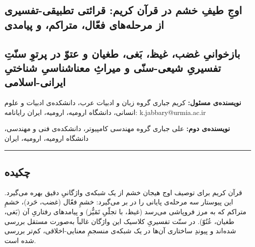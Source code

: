 \begin{RTL}
\begin{otherlanguage}{persian}

\section{اوجِ طیفِ خشم در قرآن کریم: قرائتی تطبیقی-تفسیری از مرحله‌های
فعّال، متراکم، و
پیامدی}\label{ux627ux648ux62c-ux637ux6ccux641-ux62eux634ux645-ux62fux631-ux642ux631ux622ux646-ux6a9ux631ux6ccux645-ux642ux631ux627ux626ux62aux6cc-ux62aux637ux628ux6ccux642ux6cc-ux62aux641ux633ux6ccux631ux6cc-ux627ux632-ux645ux631ux62dux644ux647ux647ux627ux6cc-ux641ux639ux627ux644-ux645ux62aux631ux627ux6a9ux645-ux648-ux67eux6ccux627ux645ux62fux6cc}

\subsection{بازخوانیِ غضب، غیظ، بَغی، طغیان و عتوّ در پرتوِ سنّتِ تفسیریِ
شیعی-سنّی و میراثِ معناشناسیِ شناختیِ
ایرانی-اسلامی}\label{ux628ux627ux632ux62eux648ux627ux646ux6cc-ux63aux636ux628-ux63aux6ccux638-ux628ux63aux6cc-ux637ux63aux6ccux627ux646-ux648-ux639ux62aux648-ux62fux631-ux67eux631ux62aux648-ux633ux646ux62a-ux62aux641ux633ux6ccux631ux6cc-ux634ux6ccux639ux6cc-ux633ux646ux6cc-ux648-ux645ux6ccux631ux627ux62b-ux645ux639ux646ux627ux634ux646ux627ux633ux6cc-ux634ux646ux627ux62eux62aux6cc-ux627ux6ccux631ux627ux646ux6cc-ux627ux633ux644ux627ux645ux6cc}

\textbf{نویسنده‌ی مسئول:} کریم جباری گروه زبان و ادبیات عرب، دانشکده‌ی
ادبیات و علوم انسانی، دانشگاه ارومیه، ارومیه، ایران رایانامه:
k.jabbary@urmia.ac.ir

\textbf{نویسنده‌ی دوم:} علی جباری گروه مهندسی کامپیوتر، دانشکده‌ی فنی و
مهندسی، دانشگاه ارومیه، ارومیه، ایران

\begin{center}\rule{0.5\linewidth}{0.5pt}\end{center}

\subsection{چکیده}\label{ux686ux6a9ux6ccux62fux647}

قرآن کریم برای توصیف اوج هیجان خشم از یک شبکه‌ی واژگانیِ دقیق بهره می‌گیرد.
این پیوستار سه مرحله‌ی پایانی را در بر می‌گیرد: خشمِ فعّال (غضب، حَرد)، خشمِ
متراکم که به مرز فروپاشی می‌رسد (غیظ، با تجلّیِ تَمَیُّز) و پیامدهای رفتاریِ آن
(بَغی، طغیان، عُتُوّ). در سنّت تفسیریِ کلاسیک این واژگان غالباً به‌صورت مستقل
بررسی شده‌اند و پیوندِ ساختاری آن‌ها در یک شبکه‌ی منسجمِ معنایی-اخلاقی، کم‌تر
بررسی شده است.


\end{otherlanguage}
\end{RTL}
